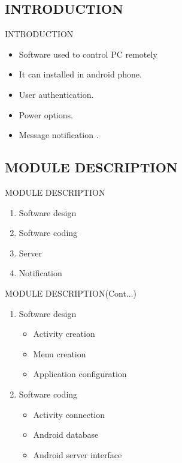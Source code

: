 \subsection{INTRODUCTION}
\begin{frame}{INTRODUCTION}
   \begin{itemize}
    
   	\item Software used to control PC remotely
   	\item It can installed in android phone.
   	\item User authentication.
   	\item Power options.
   	\item Message notification .


   \end{itemize}
 \end{frame}  

\subsection{MODULE DESCRIPTION}
\begin{frame}{MODULE DESCRIPTION}
   \begin{enumerate}
  \item Software design
  \item Software coding
  \item Server
  \item Notification 
  \end{enumerate}
  \end{frame}
\begin{frame}{MODULE DESCRIPTION(Cont...)}
   \begin{enumerate}
  \item Software design
  \begin{itemize}
   \item Activity creation
  \item Menu creation
  \item Application configuration 
  \end{itemize}
 
  \item Software coding
  \begin{itemize}
  \item Activity connection
  \item Android database
  \item Android server interface
  \end{itemize}
  \end{enumerate}
  \end{frame}
  
